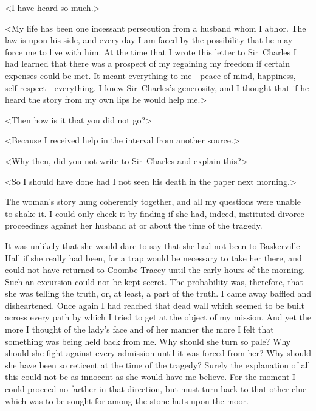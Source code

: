 <I have heard so much.>

<My life has been one incessant persecution from a husband whom I abhor. The law is upon his side, and every day I am faced by the possibility that he may force me to live with him. At the time that I wrote this letter to Sir~Charles I had learned that there was a prospect of my regaining my freedom if certain expenses could be met. It meant everything to me—peace of mind, happiness, self-respect—everything. I knew Sir~Charles's generosity, and I thought that if he heard the story from my own lips he would help me.>

<Then how is it that you did not go?>

<Because I received help in the interval from another source.>

<Why then, did you not write to Sir~Charles and explain this?>

<So I should have done had I not seen his death in the paper next morning.>

The woman's story hung coherently together, and all my questions were unable to shake it. I could only check it by finding if she had, indeed, instituted divorce proceedings against her husband at or about the time of the tragedy.

It was unlikely that she would dare to say that she had not been to Baskerville Hall if she really had been, for a trap would be necessary to take her there, and could not have returned to Coombe Tracey until the early hours of the morning. Such an excursion could not be kept secret. The probability was, therefore, that she was telling the truth, or, at least, a part of the truth. I came away baffled and disheartened. Once again I had reached that dead wall which seemed to be built across every path by which I tried to get at the object of my mission. And yet the more I thought of the lady's face and of her manner the more I felt that something was being held back from me. Why should she turn so pale? Why should she fight against every admission until it was forced from her? Why should she have been so reticent at the time of the tragedy? Surely the explanation of all this could not be as innocent as she would have me believe. For the moment I could proceed no farther in that direction, but must turn back to that other clue which was to be sought for among the stone huts upon the moor.

